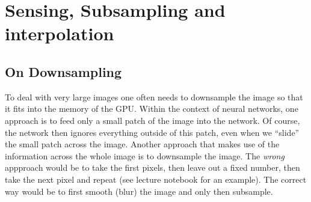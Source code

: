 \chapter{Sensing, Subsampling and interpolation}%
\label{chap:02}
\setcounter{section}{1}
\section{On Downsampling}
To deal with very large images one often needs to downsample the image so that
it fits into the memory of the GPU. Within the context of neural networks, one
approach is to feed only a small patch of the image into the network. Of course,
the network then ignores everything outside of this patch, even when we
``slide'' the small patch across the image. Another approach that makes use of
the information across the whole image is to downsample the image. The
\emph{wrong} appproach would be to take the first pixels, then leave out a fixed
number, then take the next pixel and repeat (see lecture notebook for an
example). The correct way would be to first smooth (blur) the image and only
then subsample.


